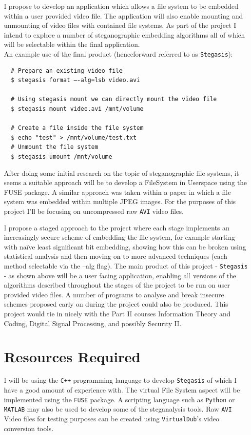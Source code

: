 \documentclass[paper=a4, fontsize=11pt,twoside]{scrartcl}
\numberwithin{table}{section}
\numberwithin{figure}{section}
\numberwithin{algorithm}{section}
\begin{document}
I propose to develop an application which allows a file system to be embedded within a user provided video file. The application will also enable mounting and unmounting of video files with contained file systems. As part of the project I intend to explore a number of steganographic embedding algorithms all of which will be selectable within the final application.\\

\noindent
An example use of the final product (henceforward referred to as \texttt{Stegasis}):
\begin{verbatim}
  # Prepare an existing video file
  $ stegasis format –-alg=lsb video.avi
     
  # Using stegasis mount we can directly mount the video file
  $ stegasis mount video.avi /mnt/volume
 
  # Create a file inside the file system
  $ echo "test" > /mnt/volume/test.txt
  # Unmount the file system
  $ stegasis umount /mnt/volume
\end{verbatim}
 
After doing some initial research on the topic of steganographic file systems, it seems a suitable approach will be to develop a FileSystem in Userspace using the FUSE package. A similar approach was taken within a paper in which a file system was embedded within multiple JPEG images. For the purposes of this project I'll be focusing on uncompressed raw \texttt{AVI} video files.
 
I propose a staged approach to the project where each stage implements an increasingly secure scheme of embedding the file system, for example starting with na\"{i}ve least significant bit embedding, showing how this can be broken using statistical analysis and then moving on to more advanced techniques (each method selectable via the --alg flag).
The main product of this project - \texttt{Stegasis} - as shown above will be a user facing application, enabling all versions of the algorithms described throughout the stages of the project to be run on user provided video files. A number of programs to analyse and break insecure schemes proposed early on during the project could also be produced.
This project would tie in nicely with the Part II courses Information Theory and Coding, Digital Signal Processing, and possibly Security II.

\section*{Resources Required}
I will be using the \texttt{C++} programming language to develop \texttt{Stegasis} of which I have a good amount of experience with. The virtual File System aspect will be implemented using the \texttt{FUSE} package. A scripting language such as \texttt{Python} or \texttt{MATLAB} may also be used to develop some of the steganalysis tools. Raw \texttt{AVI} Video files for testing purposes can be created using \texttt{VirtualDub}'s video conversion tools.
\end{document}
